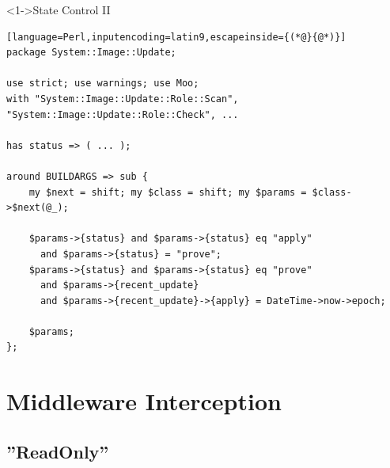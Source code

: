 \documentclass[ngerman,xcolor={table,dvipsnames},smaller,compress,hyperref={bookmarks,colorlinks}]{beamer}%
\begin{document}
\begin{frame}[t,fragile]

\begin{block}<1->{State Control II}
\scriptsize
\begin{lstlisting}[language=Perl,inputencoding=latin9,escapeinside={(*@}{@*)}]
package System::Image::Update;

use strict; use warnings; use Moo;
with "System::Image::Update::Role::Scan", "System::Image::Update::Role::Check", ...

has status => ( ... );

around BUILDARGS => sub {
    my $next = shift; my $class = shift; my $params = $class->$next(@_);

    $params->{status} and $params->{status} eq "apply"
      and $params->{status} = "prove";
    $params->{status} and $params->{status} eq "prove"
      and $params->{recent_update}
      and $params->{recent_update}->{apply} = DateTime->now->epoch;

    $params;
};
\end{lstlisting}
\end{block}

\begin{itemize}
\end{itemize}

\end{frame}

\section{Middleware Interception}

\subsection{''ReadOnly''}
\end{document}

